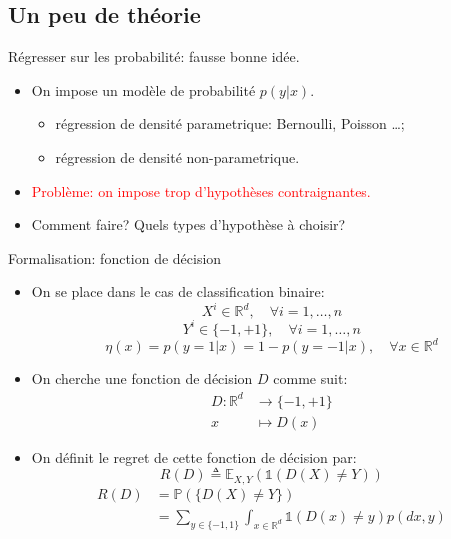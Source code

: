 \documentclass[8pt]{beamer}
\begin{document}
	\subsection{Un peu de théorie}
		\begin{frame}{Régresser sur les probabilité: fausse bonne idée.}
			\begin{itemize}
				\item<1-> On impose un modèle de probabilité $p(y\vert x)$.
					\begin{itemize}
						\item régression de densité parametrique: Bernoulli, Poisson \dots;
						\item régression de densité non-parametrique.
					\end{itemize}
				\item<2-> \textcolor{red}{Problème: on impose trop d'hypothèses contraignantes.}
				\item<3-> Comment faire? Quels types d'hypothèse à choisir?
			\end{itemize}
		\end{frame}
		\begin{frame}{Formalisation: fonction de décision}
			\begin{itemize}
				\item<1-> On se place dans le cas de classification binaire:
					$$ X^i \in \mathbb{R}^d , \quad \forall i=1,\dots,n$$
					$$ Y^i \in \{-1, +1\} , \quad \forall i=1,\dots,n$$
					$$\eta(x) = p(y = 1 \vert x) = 1 - p(y = -1 \vert x), \quad \forall x \in \mathbb{R}^d$$
				\item<2-> On cherche une fonction de décision $D$ comme suit:
				\begin{align*}
					D: \mathbb{R}^d &\rightarrow \{-1, +1\} \\
					x &\mapsto D(x)
				\end{align*}
				\item<3-> On définit le regret de cette fonction de décision par:
				\begin{equation}
					R(D) \triangleq \mathbb{E}_{X,Y}(\mathbb{1}(D(X)\neq Y))
				\end{equation}
				\begin{align*}
					R(D) &= \mathbb{P}(\{D(X)\neq Y\})\\
						 &= \sum_{y\in \{-1, 1\}} \int_{x \in \mathbb{R}^d} \mathbb{1}(D(x)\neq y) p(dx, y)
				\end{align*}
			\end{itemize}
		\end{frame}
\end{document}
